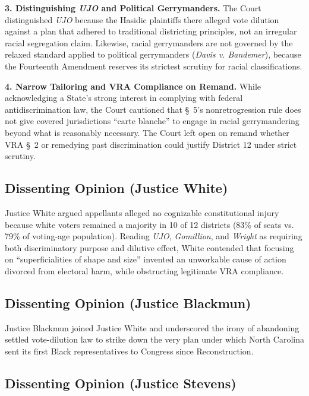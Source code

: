 \documentclass[12pt]{article}
\begin{document}
\textbf{3. Distinguishing \textit{UJO} and Political Gerrymanders.} The Court distinguished \textit{UJO} because the Hasidic plaintiffs there alleged vote dilution against a plan that adhered to traditional districting principles, not an irregular racial segregation claim. Likewise, racial gerrymanders are not governed by the relaxed standard applied to political gerrymanders (\textit{Davis v. Bandemer}), because the Fourteenth Amendment reserves its strictest scrutiny for racial classifications.

\textbf{4. Narrow Tailoring and VRA Compliance on Remand.} While acknowledging a State's strong interest in complying with federal antidiscrimination law, the Court cautioned that \S~5's nonretrogression rule does not give covered jurisdictions ``carte blanche'' to engage in racial gerrymandering beyond what is reasonably necessary. The Court left open on remand whether VRA \S~2 or remedying past discrimination could justify District 12 under strict scrutiny.

\subsection{Dissenting Opinion (Justice White)}

Justice White argued appellants alleged no cognizable constitutional injury because white voters remained a majority in 10 of 12 districts (83\% of seats vs. 79\% of voting-age population). Reading \textit{UJO}, \textit{Gomillion}, and \textit{Wright} as requiring both discriminatory purpose and dilutive effect, White contended that focusing on ``superficialities of shape and size'' invented an unworkable cause of action divorced from electoral harm, while obstructing legitimate VRA compliance.

\subsection{Dissenting Opinion (Justice Blackmun)}

Justice Blackmun joined Justice White and underscored the irony of abandoning settled vote-dilution law to strike down the very plan under which North Carolina sent its first Black representatives to Congress since Reconstruction.

\subsection{Dissenting Opinion (Justice Stevens)}
\end{document}
